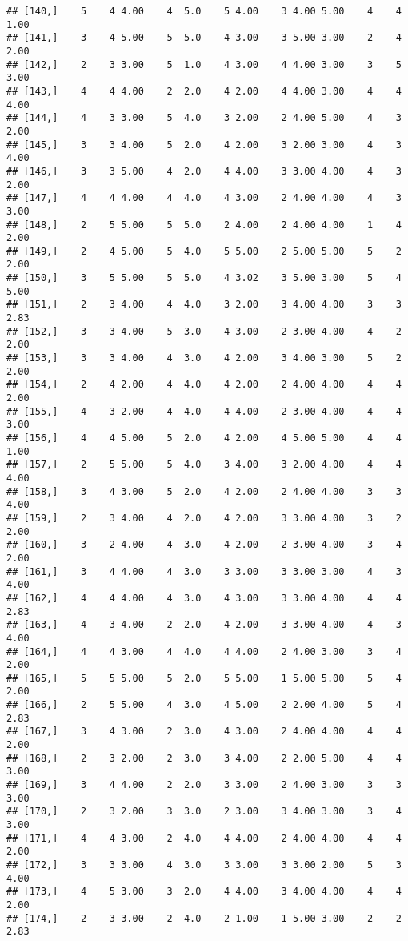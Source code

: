 \documentclass[]{article}
\begin{document}
\begin{verbatim}
## [140,]    5    4 4.00    4  5.0    5 4.00    3 4.00 5.00    4    4 1.00
## [141,]    3    4 5.00    5  5.0    4 3.00    3 5.00 3.00    2    4 2.00
## [142,]    2    3 3.00    5  1.0    4 3.00    4 4.00 3.00    3    5 3.00
## [143,]    4    4 4.00    2  2.0    4 2.00    4 4.00 3.00    4    4 4.00
## [144,]    4    3 3.00    5  4.0    3 2.00    2 4.00 5.00    4    3 2.00
## [145,]    3    3 4.00    5  2.0    4 2.00    3 2.00 3.00    4    3 4.00
## [146,]    3    3 5.00    4  2.0    4 4.00    3 3.00 4.00    4    3 2.00
## [147,]    4    4 4.00    4  4.0    4 3.00    2 4.00 4.00    4    3 3.00
## [148,]    2    5 5.00    5  5.0    2 4.00    2 4.00 4.00    1    4 2.00
## [149,]    2    4 5.00    5  4.0    5 5.00    2 5.00 5.00    5    2 2.00
## [150,]    3    5 5.00    5  5.0    4 3.02    3 5.00 3.00    5    4 5.00
## [151,]    2    3 4.00    4  4.0    3 2.00    3 4.00 4.00    3    3 2.83
## [152,]    3    3 4.00    5  3.0    4 3.00    2 3.00 4.00    4    2 2.00
## [153,]    3    3 4.00    4  3.0    4 2.00    3 4.00 3.00    5    2 2.00
## [154,]    2    4 2.00    4  4.0    4 2.00    2 4.00 4.00    4    4 2.00
## [155,]    4    3 2.00    4  4.0    4 4.00    2 3.00 4.00    4    4 3.00
## [156,]    4    4 5.00    5  2.0    4 2.00    4 5.00 5.00    4    4 1.00
## [157,]    2    5 5.00    5  4.0    3 4.00    3 2.00 4.00    4    4 4.00
## [158,]    3    4 3.00    5  2.0    4 2.00    2 4.00 4.00    3    3 4.00
## [159,]    2    3 4.00    4  2.0    4 2.00    3 3.00 4.00    3    2 2.00
## [160,]    3    2 4.00    4  3.0    4 2.00    2 3.00 4.00    3    4 2.00
## [161,]    3    4 4.00    4  3.0    3 3.00    3 3.00 3.00    4    3 4.00
## [162,]    4    4 4.00    4  3.0    4 3.00    3 3.00 4.00    4    4 2.83
## [163,]    4    3 4.00    2  2.0    4 2.00    3 3.00 4.00    4    3 4.00
## [164,]    4    4 3.00    4  4.0    4 4.00    2 4.00 3.00    3    4 2.00
## [165,]    5    5 5.00    5  2.0    5 5.00    1 5.00 5.00    5    4 2.00
## [166,]    2    5 5.00    4  3.0    4 5.00    2 2.00 4.00    5    4 2.83
## [167,]    3    4 3.00    2  3.0    4 3.00    2 4.00 4.00    4    4 2.00
## [168,]    2    3 2.00    2  3.0    3 4.00    2 2.00 5.00    4    4 3.00
## [169,]    3    4 4.00    2  2.0    3 3.00    2 4.00 3.00    3    3 3.00
## [170,]    2    3 2.00    3  3.0    2 3.00    3 4.00 3.00    3    4 3.00
## [171,]    4    4 3.00    2  4.0    4 4.00    2 4.00 4.00    4    4 2.00
## [172,]    3    3 3.00    4  3.0    3 3.00    3 3.00 2.00    5    3 4.00
## [173,]    4    5 3.00    3  2.0    4 4.00    3 4.00 4.00    4    4 2.00
## [174,]    2    3 3.00    2  4.0    2 1.00    1 5.00 3.00    2    2 2.83

\end{verbatim}
\end{document}
